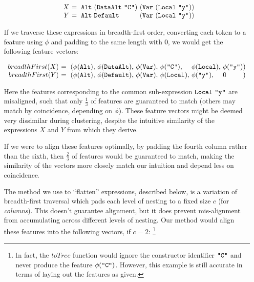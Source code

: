 \begin{equation}
  \begin{array}{r@{}l@{}l@{}}
    X\ &=\ \CAlt\ (\CDataAlt\ \id{C})\ & (\vlocal{y}) \\
    Y\ &=\ \CAlt\ \CDefault\           & (\vlocal{y})
  \end{array}
\end{equation}

If we traverse these expressions in breadth-first order, converting each token to a feature using $\phi$ and padding to the same length with $0$, we would get the following feature vectors:

\begin{small}
  \begin{equation}
    \begin{array}{r@{}l@{}l@{}l@{}l@{}l@{}l@{}l}
      breadthFirst(X)\ &=\ (\feature{\CAlt},\ &\feature{\CDataAlt},\ &\feature{\CVar},\ &\feature{\id{C}},\ &\feature{\CLocal},\ &\feature{\id{y}} &) \\
      breadthFirst(Y)\ &=\ (\feature{\CAlt},\ &\feature{\CDefault},\ &\feature{\CVar},\ &\feature{\CLocal},\ &\feature{\id{y}},\ &0 &)
    \end{array}
  \end{equation}
\end{small}

Here the features corresponding to the common sub-expression $\texttt{Local}\ \texttt{"y"}$ are misaligned, such that only $\frac{1}{3}$ of features are guaranteed to match (others may match by coincidence, depending on $\phi$). These feature vectors might be deemed very dissimilar during clustering, despite the intuitive similarity of the expressions $X$ and $Y$ from which they derive.

If we were to align these features optimally, by padding the fourth column rather than the sixth, then $\frac{2}{3}$ of features would be guaranteed to match, making the similarity of the vectors more closely match our intuition and depend less on coincidence.

The method we use to ``flatten'' expressions, described below, is a variation of breadth-first traversal which pads each level of nesting to a fixed size $c$ (for \emph{columns}). This doesn't guarantee alignment, but it does prevent mis-alignment from accumulating across different levels of nesting. Our method would align these features into the following vectors, if $c = 2$: \footnote{In fact, the $toTree$ function would ignore the constructor identifier $\texttt{"C"}$ and never produce the feature $\phi(\texttt{"C"})$. However, this example is still accurate in terms of laying out the features as given.}

